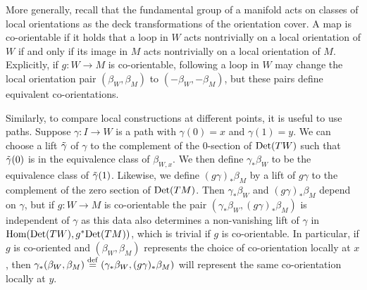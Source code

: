 More generally, recall that the fundamental group of a manifold acts on classes of local orientations as the deck transformations of the orientation cover.
A map is co-orientable if it holds that a loop in $W$ acts nontrivially on a local orientation of $W$ if and only if
its image in $M$ acts nontrivially on a local orientation of $M$.
Explicitly, if $g \colon W \to M$ is co-orientable, following a loop in $W$ may change the local orientation pair
$(\beta_W, \beta_M)$ to $(-\beta_W, -\beta_M)$, but these pairs define equivalent co-orientations.


Similarly, to compare local constructions at different points, it is useful to use paths.
Suppose $\gamma \colon I \to W$ is a path with $\gamma(0) = x$ and $\gamma(1) = y$.
We can choose a lift $\tilde \gamma$ of $\gamma$ to the complement of the $0$-section of ${\rm Det}(TW)$ such that $\tilde \gamma(0)$ is in the equivalence class of $\beta_{W,x}$.
We then define $\gamma_*\beta_{W}$ to be the equivalence class of $\tilde \gamma(1)$.
Likewise, we define $(g\gamma)_*\beta_M$ by a lift of $g\gamma$ to the complement of the zero section of ${\rm Det}(TM)$.
Then $\gamma_*\beta_{W}$ and $(g\gamma)_*\beta_M$ depend on $\gamma$, but if $g \colon W \to M$ is co-orientable the pair $(\gamma_*\beta_{W}, (g\gamma)_*\beta_M)$ is independent of $\gamma$ as this data also determines a non-vanishing lift of $\gamma$ in $\textup{Hom}({\rm Det}(TW),g^*{\rm Det}(TM))$, which is trivial if $g$ is co-orientable.
In particular, if $g$ is co-oriented and $(\beta_{W}, \beta_M)$ represents the choice of co-orientation locally at $x$, then $\gamma_*(\beta_W,\beta_M) \stackrel{\mathrm{def}}{=} (\gamma_*\beta_{W}, (g\gamma)_*\beta_M)$ will represent the same co-orientation locally at $y$.

